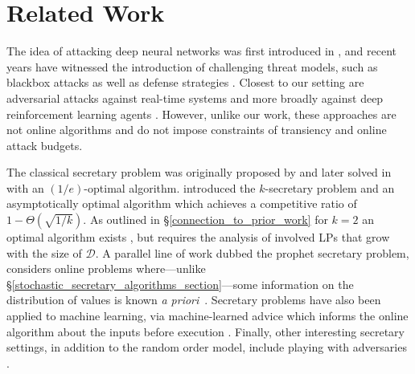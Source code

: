 \section{Related Work}
 The idea of attacking deep neural networks was first introduced in \citep{szegedy2013intriguing,goodfellow2014explaining}, and recent years have witnessed the introduction of challenging threat models, such as blackbox attacks \cite{chen2017zoo,ilyas2018black, jiang2019black,bose2020adversarial,chakraborty2018adversarial} as well as defense strategies \cite{madry2017towards,tramer2017ensemble,Ding2020MMA}.
Closest to our setting are adversarial attacks against real-time systems \cite{gong2019real, gong2019remasc} and more broadly against deep reinforcement learning agents \cite{lin2017tactics,sun2020stealthy}. However, unlike our work, these approaches are not online algorithms and do not impose constraints of transiency and online attack budgets. 

 The classical secretary problem was originally proposed by \cite{gardner1960mathematical} and later solved in \cite{dynkin1963optimum} with an $(1/e)$-optimal algorithm. \citet{kleinberg2005multiple} introduced the $k$-secretary problem and an asymptotically optimal algorithm which achieves a competitive ratio of $1 - \Theta(\sqrt{1/k})$. 
As outlined in \S\ref{connection_to_prior_work} for $k = 2$ an optimal algorithm exists \cite{chan2014revealing}, but requires the analysis of involved LPs that grow with the size of $\mathcal{D}$. A parallel line of work dubbed the prophet secretary problem, considers online problems where---unlike \S\ref{stochastic_secretary_algorithms_section}---some information on the distribution of values is known \textit{a priori}~\cite{azar2014prophet, azar2018prophet, esfandiari2017prophet}. Secretary problems have also been applied to machine learning, via machine-learned advice which informs the online algorithm about the inputs before execution \cite{antoniadis2020secretary,dutting2020secretaries}. 
Finally, other interesting secretary settings, in addition to the random order model, include playing with adversaries \cite{bradac2019robust, kaplan2020competitive}.




